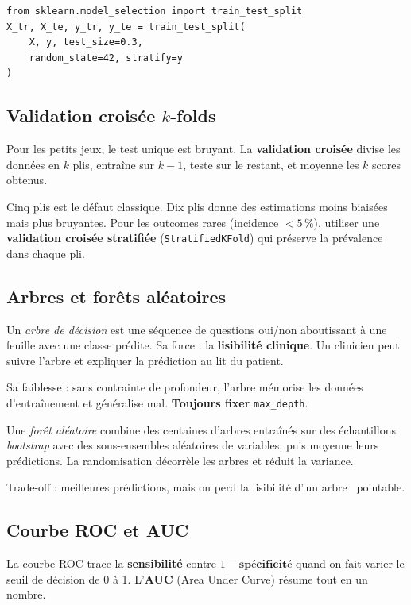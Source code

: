\documentclass[11pt,a4paper]{article}
\providecommand{\og}{\guillemotleft\,}
\providecommand{\fg}{\,\guillemotright}
\begin{document}
\begin{verbatim}
from sklearn.model_selection import train_test_split
X_tr, X_te, y_tr, y_te = train_test_split(
    X, y, test_size=0.3,
    random_state=42, stratify=y
)
\end{verbatim}

\subsection{Validation crois\'ee $k$-folds}

Pour les petits jeux, le test unique est bruyant. La \textbf{validation
crois\'ee} divise les donn\'ees en $k$ plis, entra\^ine sur $k-1$, teste
sur le restant, et moyenne les $k$ scores obtenus.

Cinq plis est le d\'efaut classique. Dix plis donne des estimations
moins biais\'ees mais plus bruyantes. Pour les outcomes rares (incidence
$< 5\,\%$), utiliser une \textbf{validation crois\'ee stratifi\'ee}
(\texttt{StratifiedKFold}) qui pr\'eserve la pr\'evalence dans chaque
pli.

\subsection{Arbres et for\^ets al\'eatoires}

Un \emph{arbre de d\'ecision} est une s\'equence de questions oui/non
aboutissant \`a une feuille avec une classe pr\'edite. Sa force : la
\textbf{lisibilit\'e clinique}. Un clinicien peut suivre l'arbre et
expliquer la pr\'ediction au lit du patient.

Sa faiblesse : sans contrainte de profondeur, l'arbre m\'emorise les
donn\'ees d'entra\^inement et g\'en\'eralise mal. \textbf{Toujours fixer}
\texttt{max\_depth}.

Une \emph{for\^et al\'eatoire} combine des centaines d'arbres
entra\^in\'es sur des \'echantillons \emph{bootstrap} avec des
sous-ensembles al\'eatoires de variables, puis moyenne leurs
pr\'edictions. La randomisation d\'ecorr\`ele les arbres et r\'eduit la
variance.

Trade-off : meilleures pr\'edictions, mais on perd la lisibilit\'e
d'\og un arbre \fg{} pointable.

\subsection{Courbe ROC et AUC}

La courbe ROC trace la \textbf{sensibilit\'e} contre $1 -
\textbf{sp\'ecificit\'e}$ quand on fait varier le seuil de d\'ecision de
0 \`a 1. L'\textbf{AUC} (Area Under Curve) r\'esume tout en un nombre.
\end{document}
